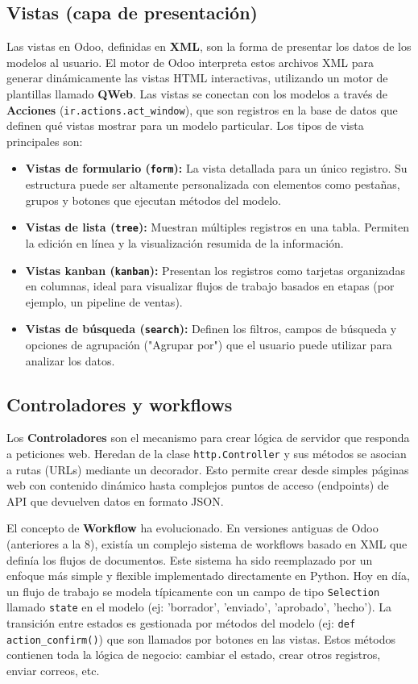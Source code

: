 \documentclass[12pt,letterpaper,spanish]{report}
\begin{document}
\subsection{Vistas (capa de presentación)}
\label{sub:vistas_odoo}
Las vistas en Odoo, definidas en \textbf{XML}, son la forma de presentar los datos de los modelos al usuario. El motor de Odoo interpreta estos archivos XML para generar dinámicamente las vistas HTML interactivas, utilizando un motor de plantillas llamado \textbf{QWeb}. Las vistas se conectan con los modelos a través de \textbf{Acciones} (\texttt{ir.actions.act\_window}), que son registros en la base de datos que definen qué vistas mostrar para un modelo particular. Los tipos de vista principales son:
\begin{itemize}
    \item \textbf{Vistas de formulario (\texttt{form}):} La vista detallada para un único registro. Su estructura puede ser altamente personalizada con elementos como pestañas, grupos y botones que ejecutan métodos del modelo.
    \item \textbf{Vistas de lista (\texttt{tree}):} Muestran múltiples registros en una tabla. Permiten la edición en línea y la visualización resumida de la información.
    \item \textbf{Vistas kanban (\texttt{kanban}):} Presentan los registros como tarjetas organizadas en columnas, ideal para visualizar flujos de trabajo basados en etapas (por ejemplo, un pipeline de ventas).
    \item \textbf{Vistas de búsqueda (\texttt{search}):} Definen los filtros, campos de búsqueda y opciones de agrupación ("Agrupar por") que el usuario puede utilizar para analizar los datos.
\end{itemize}

\subsection{Controladores y workflows}
\label{sub:controladores_workflows}
Los \textbf{Controladores} son el mecanismo para crear lógica de servidor que responda a peticiones web. Heredan de la clase \texttt{http.Controller} y sus métodos se asocian a rutas (URLs) mediante un decorador. Esto permite crear desde simples páginas web con contenido dinámico hasta complejos puntos de acceso (endpoints) de API que devuelven datos en formato JSON.

El concepto de \textbf{Workflow} ha evolucionado. En versiones antiguas de Odoo (anteriores a la 8), existía un complejo sistema de workflows basado en XML que definía los flujos de documentos. Este sistema ha sido reemplazado por un enfoque más simple y flexible implementado directamente en Python. Hoy en día, un flujo de trabajo se modela típicamente con un campo de tipo \texttt{Selection} llamado \texttt{state} en el modelo (ej: 'borrador', 'enviado', 'aprobado', 'hecho'). La transición entre estados es gestionada por métodos del modelo (ej: \texttt{def action\_confirm()}) que son llamados por botones en las vistas. Estos métodos contienen toda la lógica de negocio: cambiar el estado, crear otros registros, enviar correos, etc.
\end{document}
